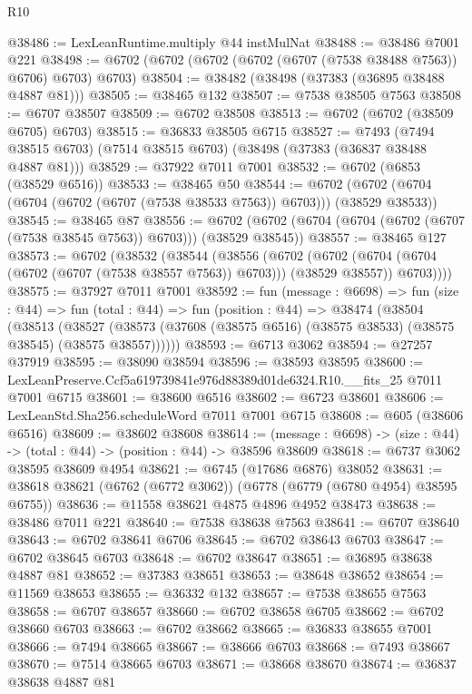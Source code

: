 \begin{lexlean}{R10}
\begin{coremodule}
@38486 := LexLeanRuntime.multiply @44 instMulNat
@38488 := @38486 @7001 @221
@38498 := @6702 (@6702 (@6702 (@6702 (@6707 (@7538 @38488 @7563)) @6706) @6703) @6703)
@38504 := @38482 (@38498 (@37383 (@36895 @38488 @4887 @81)))
@38505 := @38465 @132
@38507 := @7538 @38505 @7563
@38508 := @6707 @38507
@38509 := @6702 @38508
@38513 := @6702 (@6702 (@38509 @6705) @6703)
@38515 := @36833 @38505 @6715
@38527 := @7493
    (@7494 @38515 @6703)
    (@7514 @38515 @6703)
    (@38498 (@37383 (@36837 @38488 @4887 @81)))
@38529 := @37922 @7011 @7001
@38532 := @6702 (@6853 (@38529 @6516))
@38533 := @38465 @50
@38544 := @6702 (@6702 (@6704 (@6704 (@6702 (@6707 (@7538 @38533 @7563)) @6703))) (@38529 @38533))
@38545 := @38465 @87
@38556 := @6702 (@6702 (@6704 (@6704 (@6702 (@6707 (@7538 @38545 @7563)) @6703))) (@38529 @38545))
@38557 := @38465 @127
@38573 := @6702
    (@38532
      (@38544
        (@38556
          (@6702
            (@6702 (@6704 (@6704 (@6702 (@6707 (@7538 @38557 @7563)) @6703))) (@38529 @38557))
            @6703))))
@38575 := @37927 @7011 @7001
@38592 := fun (message : @6698) =>
  fun (size : @44) =>
  fun (total : @44) =>
  fun (position : @44) =>
  @38474
    (@38504
      (@38513
        (@38527 (@38573 (@37608 (@38575 @6516) (@38575 @38533) (@38575 @38545) (@38575 @38557))))))
@38593 := @6713 @3062
@38594 := @27257 @37919
@38595 := @38090 @38594
@38596 := @38593 @38595
@38600 := LexLeanPreserve.Ccf5a619739841e976d88389d01de6324.R10.__fits_25 @7011 @7001 @6715
@38601 := @38600 @6516
@38602 := @6723 @38601
@38606 := LexLeanStd.Sha256.scheduleWord @7011 @7001 @6715
@38608 := @605 (@38606 @6516)
@38609 := @38602 @38608
@38614 := (message : @6698) -> (size : @44) -> (total : @44) -> (position : @44) -> @38596 @38609
@38618 := @6737 @3062 @38595 @38609 @4954
@38621 := @6745 (@17686 @6876) @38052
@38631 := @38618 @38621 (@6762 (@6772 @3062)) (@6778 (@6779 (@6780 @4954) @38595 @6755))
@38636 := @11558 @38621 @4875 @4896 @4952 @38473
@38638 := @38486 @7011 @221
@38640 := @7538 @38638 @7563
@38641 := @6707 @38640
@38643 := @6702 @38641 @6706
@38645 := @6702 @38643 @6703
@38647 := @6702 @38645 @6703
@38648 := @6702 @38647
@38651 := @36895 @38638 @4887 @81
@38652 := @37383 @38651
@38653 := @38648 @38652
@38654 := @11569 @38653
@38655 := @36332 @132
@38657 := @7538 @38655 @7563
@38658 := @6707 @38657
@38660 := @6702 @38658 @6705
@38662 := @6702 @38660 @6703
@38663 := @6702 @38662
@38665 := @36833 @38655 @7001
@38666 := @7494 @38665
@38667 := @38666 @6703
@38668 := @7493 @38667
@38670 := @7514 @38665 @6703
@38671 := @38668 @38670
@38674 := @36837 @38638 @4887 @81

\end{coremodule}
\end{lexlean}
